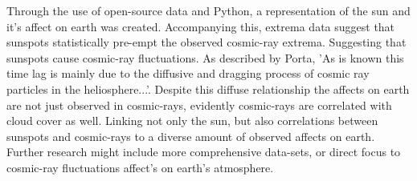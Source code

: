 Through the use of open-source data and Python, a representation of the sun and it's affect on earth 
was created.
Accompanying this, extrema data suggest that sunspots statistically
pre-empt the observed cosmic-ray extrema. Suggesting that sunspots cause
cosmic-ray fluctuations. As described by Porta, 'As is known this time lag
is mainly due to the diffusive and dragging process of cosmic ray particles
in the heliosphere...'\cite{Sierra-Porta2019}. Despite this diffuse
relationship the affects on earth are not just observed in cosmic-rays,
evidently cosmic-rays are correlated with cloud cover as well.\cite{Svensmark2016}
Linking not only the sun, but also correlations between sunspots and cosmic-rays
to a diverse amount of observed affects on earth. Further research might include
more comprehensive data-sets, or direct focus to cosmic-ray fluctuations affect's 
on earth's atmosphere.

